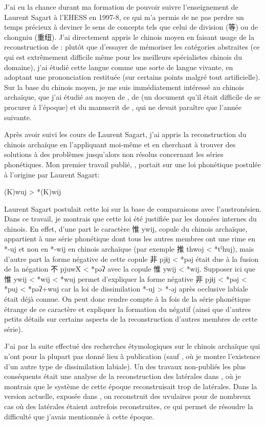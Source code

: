 \documentclass[oldfontcommands,oneside,a4paper,11pt]{memoir}
\newcommand{\zh}[1]{{\cn #1}}
\begin{document}
J'ai eu la chance durant ma formation de pouvoir suivre l'enseignement de Laurent Sagart à l'EHESS en 1997-8, ce qui m'a permis de ne pas perdre   un temps précieux à deviner le sens de concepts  
tels que celui de division (\zh{等}) ou de chongniu (\zh{重纽}). J'ai directement appris le chinois moyen en faisant usage de la reconstruction de \citet{baxter92}: plutôt que d'essayer de mémoriser les catégories abstraites (ce qui est extrêmement difficile même pour les meilleurs spécialistes chinois du domaine), j'ai étudié cette langue comme une sorte de langue vivante, en adoptant une prononciation restituée (sur certains points malgré tout artificielle). Sur la base du chinois moyen, je me suis immédiatement intéressé au chinois archaïque, que j'ai étudié au moyen de \citet{baxter92}, de \citet{starostin89} (un document qu'il était difficile de se procurer à l'époque) et du manuscrit de \citet{sagart99roc}, qui ne devait paraître que l'année suivante.

Après avoir suivi les cours de Laurent Sagart, j'ai appris la reconstruction du chinois archaïque en l'appliquant moi-même et en cherchant à trouver des solutions à des problèmes jusqu'alors non résolus concernant les séries phonétiques. Mon premier travail publié, \citet{jacques00ywij}, portait sur une loi phonétique postulée à l'origine par Laurent Sagart:
\begin{exe}
\ex 
\glt *(K)wuj > *(K)wij 
\end{exe}
Laurent Sagart postulait cette loi sur la base de comparaisons avec l'austronésien. Dans ce travail, je montrais que cette loi été justifiée par les données internes du chinois. En effet, d'une part le caractère \zh{惟} ywij, copule du chinois archaïque, appartient à une série phonétique dont tous les autres membres ont une rime en *-uj et non en *-wij en chinois archaïque (par exemple \zh{推} thwoj < *tˁhuj), mais d'autre part la forme négative de cette copule \zh{非} pjɨj < *pəj était due à la fusion de la négation \zh{不} pjuwX < *pəʔ avec la copule \zh{惟} ywij < *wij. Supposer ici que \zh{惟} ywij < *wij < *wuj permet d'expliquer la forme négative \zh{非} pjɨj < *pəj < *puj < *pəʔ+wuj car la loi de dissimilation *-uj > *-əj après occlusive labiale était déjà connue. On peut donc rendre compte à la fois de la série phonétique étrange de ce caractère et expliquer la formation du négatif (ainsi que d'autres petits détails sur certains aspects de la reconstruction  d'autres membres de cette série).

J'ai par la suite effectué des recherches étymologiques sur le chinois archaïque qui n'ont pour la plupart pas donné lieu à publication (sauf \citet{jacques03dissimilation}, où je montre l'existence d'un autre type de dissimilation labiale). Un des travaux non-publiés les plus conséquents était une analyse de  la reconstruction des latérales dans \citet{sagart99roc}, où je montrais que le système de cette époque reconstruisait trop de latérales. Dans la version actuelle, exposée dans \citet{sagart-baxter09}, on reconstruit des uvulaires pour de nombreux cas où des latérales étaient autrefois reconstruites, ce qui permet de résoudre la difficulté que j'avais mentionnée à cette époque.
\end{document}

